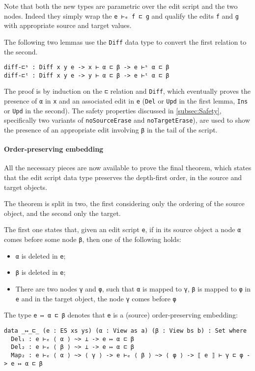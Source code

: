 \documentclass[../Thesis.tex]{subfiles}
\begin{document}
	Note that both the new types are parametric over the edit script and the 
	two nodes. Indeed they simply wrap the \texttt{e ⊢ₑ f ⊏ g} and
	qualify the edits \texttt{f} and \texttt{g} with appropriate source and
	target values.
	
	The following two lemmas use the \texttt{Diff} data type to convert
	the first relation to the second.	
\begin{verbatim}
diff-⊏ˢ : Diff x y e -> x ⊢ α ⊏ β -> e ⊢ˢ α ⊏ β
diff-⊏ᵗ : Diff x y e -> y ⊢ α ⊏ β -> e ⊢ᵗ α ⊏ β
\end{verbatim}
	The proof is by induction on the \texttt{⊏} relation and
	\texttt{Diff}, which eventually proves the presence of \texttt{α} in \texttt{x} 
	and an associated edit in \texttt{e} (\texttt{Del} or \texttt{Upd} in the first
	lemma, \texttt{Ins} or \texttt{Upd} in the second).
	The safety properties discussed in \ref{subsec:Safety}, specifically 
	two variants of \texttt{noSourceErase} and \texttt{noTargetErase}),
	are used to show the presence of an appropriate edit involving \texttt{β}
	in the tail of the script.
	
	\paragraph{Order-preserving embedding}
	All the necessary pieces are now available to prove the final theorem,
	which states that the edit script data type preserves the depth-first order,
	in the source and target objects.

	The theorem is split in two, the first considering only the ordering 
	of the source object, and the second only the target.
	
	The first one states that, given an edit script \texttt{e}, 
	if in its source object a node \texttt{α} comes before
	some node \texttt{β}, then one of the following holds:
\begin{itemize}
	\item \texttt{α} is deleted in \texttt{e};
	\item \texttt{β} is deleted in \texttt{e};
	\item There are two nodes \texttt{γ} and \texttt{φ}, such that \texttt{α} is 
	mapped to \texttt{γ}, \texttt{β} is mapped to \texttt{φ} in \texttt{e} and 
	in the target	object, the node \texttt{γ} comes before \texttt{φ}
\end{itemize}

	The type \texttt{e ↦ α ⊏ β} denotes that \texttt{e} is a (source) 
	order-preserving embedding:
\begin{verbatim}
data _↦_⊏_ (e : ES xs ys) (α : View as a) (β : View bs b) : Set where
  Del₁ : e ⊢ₑ ⟨ α ⟩ ~> ⊥ -> e ↦ α ⊏ β
  Del₂ : e ⊢ₑ ⟨ β ⟩ ~> ⊥ -> e ↦ α ⊏ β
  Map₂ : e ⊢ₑ ⟨ α ⟩ ~> ⟨ γ ⟩ -> e ⊢ₑ ⟨ β ⟩ ~> ⟨ φ ⟩ -> ⟦ e ⟧ ⊢ γ ⊏ φ -> e ↦ α ⊏ β
\end{verbatim}
\end{document}
